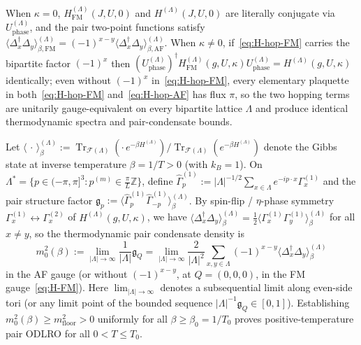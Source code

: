 \documentclass[11pt]{article}
\theoremstyle{definition}
\theoremstyle{remark}
\DeclareMathOperator{\Tr}{Tr}
\newcommand{\calF}{\mathcal{F}}
\newcommand{\bbZ}{\mathbb{Z}}
\begin{document}
When $\kappa = 0$, $H_{\mathrm{FM}}^{(\Lambda)}(J, U, 0)$ and $H^{(\Lambda)}(J, U, 0)$ are literally conjugate via $U_{\mathrm{phase}}^{(\Lambda)}$, and the pair two-point functions satisfy $\langle \Delta_x^\dagger \Delta_y \rangle_{\beta,\mathrm{FM}}^{(\Lambda)} = (-1)^{x-y} \langle \Delta_x^\dagger \Delta_y \rangle_{\beta,\mathrm{AF}}^{(\Lambda)}$. When $\kappa \ne 0$, if~\eqref{eq:H-hop-FM} carries the bipartite factor $(-1)^x$ then $(U_{\mathrm{phase}}^{(\Lambda)})^\dagger H_{\mathrm{FM}}^{(\Lambda)}(g, U, \kappa) U_{\mathrm{phase}}^{(\Lambda)} = H^{(\Lambda)}(g, U, \kappa)$ identically; even without $(-1)^x$ in~\eqref{eq:H-hop-FM}, every elementary plaquette in both~\eqref{eq:H-hop-FM} and~\eqref{eq:H-hop-AF} has flux $\pi$, so the two hopping terms are unitarily gauge-equivalent on every bipartite lattice $\Lambda$ and produce identical thermodynamic spectra and pair-condensate bounds.

Let $\langle \,\cdot\, \rangle_\beta^{(\Lambda)} := \Tr_{\calF(\Lambda)}(\cdot\, e^{-\beta H^{(\Lambda)}}) / \Tr_{\calF(\Lambda)}(e^{-\beta H^{(\Lambda)}})$ denote the Gibbs state at inverse temperature $\beta = 1/T > 0$ (with $k_B = 1$). On $\Lambda^* = \{p \in (-\pi, \pi]^3 : p^{(m)} \in \frac{\pi}{L}\bbZ\}$, define $\hat{\Gamma}_p^{(1)} := |\Lambda|^{-1/2} \sum_{x \in \Lambda} e^{-ip\cdot x} \Gamma_x^{(1)}$ and the pair structure factor $\mathfrak{g}_p := \langle \hat{\Gamma}_p^{(1)} \hat{\Gamma}_{-p}^{(1)} \rangle_\beta^{(\Lambda)}$. By spin-flip / $\eta$-phase symmetry $\Gamma_x^{(1)} \leftrightarrow \Gamma_x^{(2)}$ of $H^{(\Lambda)}(g, U, \kappa)$, we have $\langle \Delta_x^\dagger \Delta_y \rangle_\beta^{(\Lambda)} = \frac{1}{2}\langle \Gamma_x^{(1)}\Gamma_y^{(1)} \rangle_\beta^{(\Lambda)}$ for all $x \ne y$, so the thermodynamic pair condensate density is
\begin{equation}\label{eq:m0-def}
m_0^2(\beta) := \lim_{|\Lambda|\to\infty} \frac{1}{|\Lambda|} \mathfrak{g}_Q = \lim_{|\Lambda|\to\infty} \frac{2}{|\Lambda|^2} \sum_{x,y \in \Lambda} (-1)^{x-y} \langle \Delta_x^\dagger \Delta_y \rangle_\beta^{(\Lambda)}
\end{equation}
in the AF gauge (or without $(-1)^{x-y}$, at $Q = (0,0,0)$, in the FM gauge~\eqref{eq:H-FM}). Here $\lim_{|\Lambda|\to\infty}$ denotes a subsequential limit along even-side tori (or any limit point of the bounded sequence $|\Lambda|^{-1}\mathfrak{g}_Q \in [0, 1]$). Establishing $m_0^2(\beta) \ge m_{\mathrm{floor}}^2 > 0$ uniformly for all $\beta \ge \beta_0 = 1/T_0$ proves positive-temperature pair ODLRO for all $0 < T \le T_0$.
\end{document}
